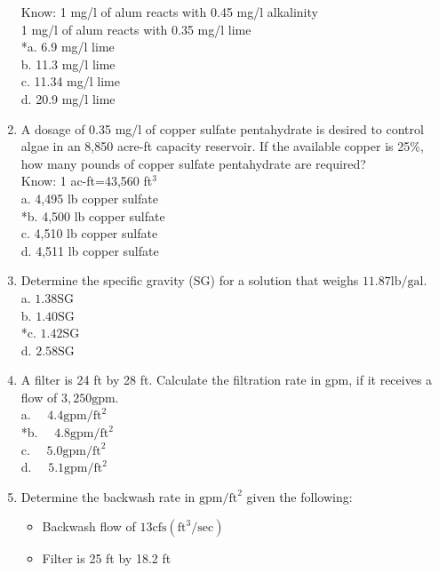 \begin{enumerate}
\begin{itemize}
\end{itemize}
Know: 1 mg/l of alum reacts with 0.45 mg/l alkalinity\\
1 mg/l of alum reacts with 0.35 mg/l lime\\
*a. 6.9 mg/l lime\\
b. 11.3 mg/l lime\\
c. 11.34 mg/l lime\\
d. 20.9 mg/l lime\\
  \item A dosage of 0.35 mg/l of copper sulfate pentahydrate is desired to control algae in an 8,850 acre-ft capacity reservoir. If the available copper is 25\%, how many pounds of copper sulfate pentahydrate are required?\\
Know: 1 ac-ft=43,560 ft$^{3}$\\
a. 4,495 lb copper sulfate\\
*b. 4,500 lb copper sulfate\\
c. 4,510 lb copper sulfate\\
d. 4,511 lb copper sulfate\\
  \item Determine the specific gravity (SG) for a solution that weighs $11.87 \mathrm{lb} / \mathrm{gal}$.\\
a. $1.38 \mathrm{SG}$\\
b. $1.40 \mathrm{SG}$\\
*c. $1.42 \mathrm{SG}$\\
d. $2.58 \mathrm{SG}$\\
  \item A filter is 24 ft by 28 ft. Calculate the filtration rate in gpm, if it receives a flow of $3,250 \mathrm{gpm}$.\\
a. $\quad 4.4 \mathrm{gpm} / \mathrm{ft}^{2}$\\
*b. $\quad 4.8 \mathrm{gpm} / \mathrm{ft}^{2}$\\
c. $\quad 5.0 \mathrm{gpm} / \mathrm{ft}^{2}$\\
d. $\quad 5.1 \mathrm{gpm} / \mathrm{ft}^{2}$\\
  \item Determine the backwash rate in $\mathrm{gpm} / \mathrm{ft}^{2}$ given the following:\\
\begin{itemize}
  \item Backwash flow of $13 \mathrm{cfs}\left(\mathrm{ft}^{3} / \mathrm{sec}\right)$\\
  \item Filter is 25 ft by 18.2 ft\\

\end{itemize}
\end{enumerate}
